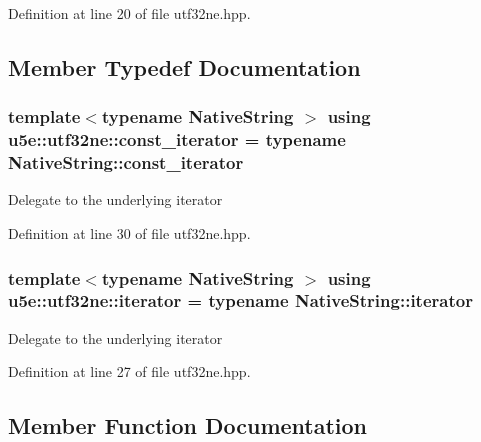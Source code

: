 Definition at line 20 of file utf32ne.\+hpp.



\subsection{Member Typedef Documentation}
\subsubsection[{\texorpdfstring{const\+\_\+iterator}{const_iterator}}]{\setlength{\rightskip}{0pt plus 5cm}template$<$typename Native\+String $>$ using {\bf u5e\+::utf32ne\+::const\+\_\+iterator} =  typename Native\+String\+::const\+\_\+iterator}\hypertarget{classu5e_1_1utf32ne_a4d281b04b01e996702b02445fa25fc76}{}\label{classu5e_1_1utf32ne_a4d281b04b01e996702b02445fa25fc76}
Delegate to the underlying iterator 

Definition at line 30 of file utf32ne.\+hpp.

\subsubsection[{\texorpdfstring{iterator}{iterator}}]{\setlength{\rightskip}{0pt plus 5cm}template$<$typename Native\+String $>$ using {\bf u5e\+::utf32ne\+::iterator} =  typename Native\+String\+::iterator}\hypertarget{classu5e_1_1utf32ne_aa94f3484382747653c46ce429612eedc}{}\label{classu5e_1_1utf32ne_aa94f3484382747653c46ce429612eedc}
Delegate to the underlying iterator 

Definition at line 27 of file utf32ne.\+hpp.



\subsection{Member Function Documentation}
